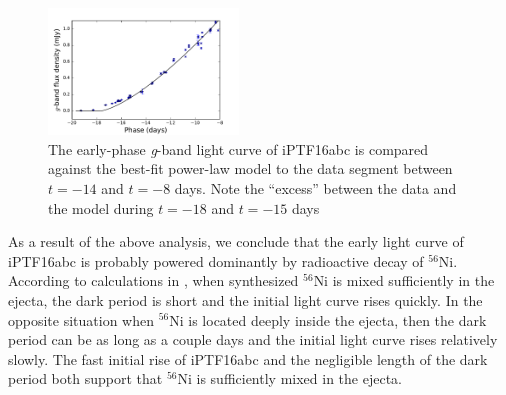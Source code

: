 \documentclass[twocolumn]{aastex61}
\begin{document}
\begin{figure}[htb]
  \centering
  \includegraphics[width=0.45\textwidth]{another_early_lc.pdf}
  \caption{The early-phase \textit{g}-band light curve of iPTF16abc is
    compared against the best-fit power-law model to the data segment
    between $t=-14$ and $t=-8$ days. Note the ``excess'' between the
    data and the model during $t=-18$ and $t=-15$ days}
  \label{fig:against_sn2012cg}
\end{figure}

As a result of the above analysis, we conclude that the early light
curve of iPTF16abc is probably powered dominantly by radioactive decay
of $^{56}$Ni.  According to calculations in
\citet{2016ApJ...826...96P}, when synthesized $^{56}$Ni is mixed
sufficiently in the ejecta, the dark period is short and the initial
light curve rises quickly. In the opposite situation when $^{56}$Ni is
located deeply inside the ejecta, then the dark period can be as long
as a couple days and the initial light curve rises relatively
slowly. The fast initial rise of iPTF16abc and the negligible length
of the dark period both support that $^{56}$Ni is sufficiently mixed
in the ejecta.




\end{document}
